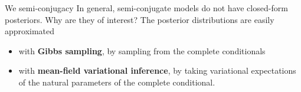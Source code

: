 \documentclass[10pt]{beamer}
\begin{document}
{
	\begin{frame}{We {\red \heart} semi-conjugacy}	 
	 In general, semi-conjugate models do not have closed-form posteriors.  
	 \vfill 
	 Why are they of interest?  \pause 
	 \vfill 
	 The posterior distributions are easily approximated 
	 \begin{itemize}
	 \item with \textbf{Gibbs sampling}, by sampling from the complete conditionals
	 \item with \textbf{mean-field variational inference}, by taking variational expectations of the natural parameters of the complete conditional.	
	 \end{itemize}  
	 
	\end{frame}
}
\end{document}
